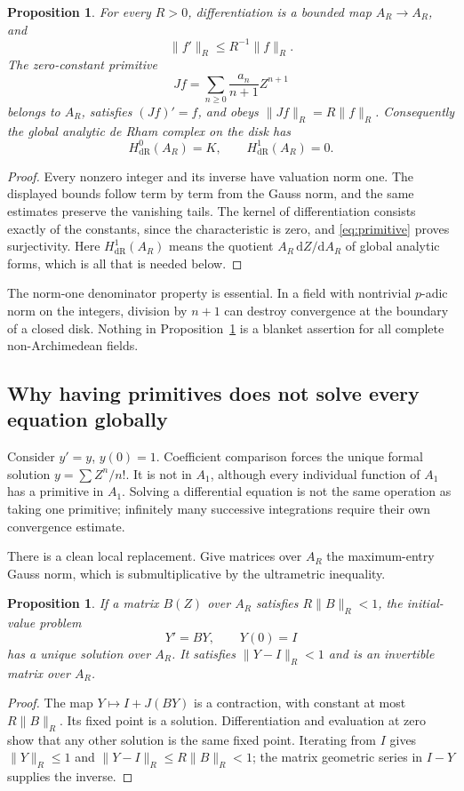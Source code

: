 \documentclass[11pt,a4paper]{article}
\numberwithin{equation}{section}
\newtheorem{proposition}[theorem]{Proposition}
\theoremstyle{definition}
\theoremstyle{remark}
\newcommand{\Gauss}[2]{\lVert#1\rVert_{#2}}
\newcommand{\dR}{\mathrm{dR}}
\newcommand{\dd}{\,\mathrm d}
\begin{document}
\begin{proposition}\label{prop:primitive}
For every $R>0$, differentiation is a bounded map $A_R\to A_R$, and
\[
 \Gauss{f'}R\le R^{-1}\Gauss fR.
\]
The zero-constant primitive
\begin{equation}\label{eq:primitive}
 Jf=\sum_{n\ge0}\frac{a_n}{n+1}Z^{n+1}
\end{equation}
belongs to $A_R$, satisfies $(Jf)'=f$, and obeys
$\Gauss{Jf}R=R\Gauss fR$. Consequently the global analytic de Rham complex on
the disk has
\[
 H^0_{\dR}(A_R)=K,\qquad H^1_{\dR}(A_R)=0.
\]
\end{proposition}
\begin{proof}
Every nonzero integer and its inverse have valuation norm one. The displayed
bounds follow term by term from the Gauss norm, and the same estimates preserve
the vanishing tails. The kernel of differentiation consists exactly of the
constants, since the characteristic is zero, and \eqref{eq:primitive} proves
surjectivity. Here $H^1_{\dR}(A_R)$ means the quotient $A_R\dd Z/\mathrm dA_R$
of global analytic forms, which is all that is needed below.
\end{proof}

The norm-one denominator property is essential. In a field with nontrivial
$p$-adic norm on the integers, division by $n+1$ can destroy convergence at the
boundary of a closed disk. Nothing in Proposition~\ref{prop:primitive} is a
blanket assertion for all complete non-Archimedean fields.

\subsection{Why having primitives does not solve every equation globally}
Consider $y'=y$, $y(0)=1$. Coefficient comparison forces the unique formal
solution $y=\sum Z^n/n!$. It is not in $A_1$, although every individual
function of $A_1$ has a primitive in $A_1$. Solving a differential equation is
not the same operation as taking one primitive; infinitely many successive
integrations require their own convergence estimate.

There is a clean local replacement. Give matrices over $A_R$ the maximum-entry
Gauss norm, which is submultiplicative by the ultrametric inequality.

\begin{proposition}\label{prop:ode}
If a matrix $B(Z)$ over $A_R$ satisfies $R\Gauss BR<1$, the initial-value
problem
\[
 Y'=BY,\qquad Y(0)=I
\]
has a unique solution over $A_R$. It satisfies $\Gauss{Y-I}R<1$ and is an
invertible matrix over $A_R$.
\end{proposition}
\begin{proof}
The map $Y\mapsto I+J(BY)$ is a contraction, with constant at most
$R\Gauss BR$. Its fixed point is a solution. Differentiation and evaluation at
zero show that any other solution is the same fixed point. Iterating from $I$
gives $\Gauss YR\le1$ and $\Gauss{Y-I}R\le R\Gauss BR<1$; the matrix
geometric series in $I-Y$ supplies the inverse.
\end{proof}
\end{document}
